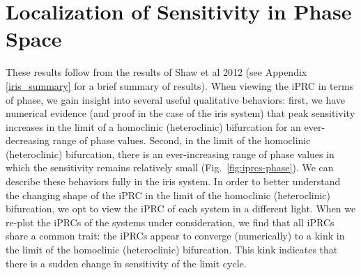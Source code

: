 
\section{Localization of Sensitivity in Phase Space}

These results follow from the results of Shaw et al 2012 (see Appendix \ref{iris_summary} for a brief summary of results).  When viewing the iPRC in terms of phase, we gain insight into several useful qualitative behaviors: first, we have numerical evidence (and proof in the case of the iris system) that peak sensitivity increases in the limit of a homoclinic (heteroclinic) bifurcation for an ever-decreasing range of phase values.  Second, in the limit of the homoclinic (heteroclinic) bifurcation, there is an ever-increasing range of phase values in which the sensitivity remains relatively small (Fig.~\ref{fig:iprcs-phase}).  We can describe these behaviors fully in the iris system.  In order to better understand the changing shape of the iPRC in the limit of the homoclinic (heteroclinic) bifurcation, we opt to view the iPRC of each system in a different light.  When we re-plot the iPRCs of the systems under consideration, we find that all iPRCs share a common trait: the iPRCs appear to converge (numerically) to a kink in the 
limit of the homoclinic (heteroclinic) 
bifurcation.  This kink indicates that there is a sudden change in 
sensitivity of the limit cycle. 





